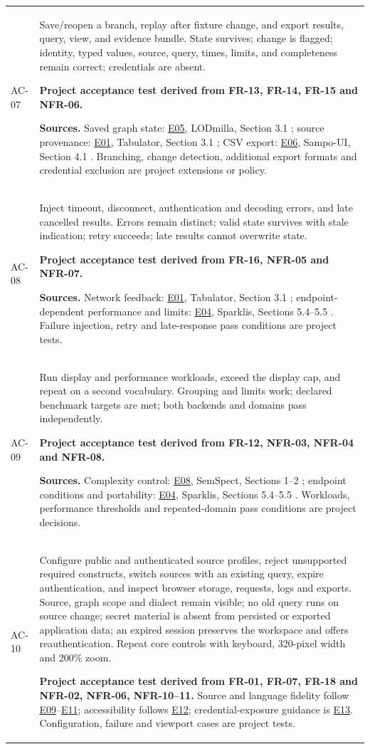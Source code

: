 \documentclass[11pt,a4paper]{article}
\newcommand{\evidence}[1]{\hyperlink{evidence:#1}{#1}}
\begin{document}
{\begin{longtable}{@{}P{1.35cm}P{14.35cm}@{}}
AC-07 & Save/reopen a branch, replay after fixture change, and export results, query, view, and evidence bundle. State survives; change is flagged; identity, typed values, source, query, times, limits, and completeness remain correct; credentials are absent.\par\smallskip \textbf{Project acceptance test derived from FR-13, FR-14, FR-15 and NFR-06.}\par\smallskip \textbf{Sources.} Saved graph state: \evidence{E05}, LODmilla, Section 3.1 \citep{lodmilla}; source provenance: \evidence{E01}, Tabulator, Section 3.1 \citep{tabulator}; CSV export: \evidence{E06}, Sampo-UI, Section 4.1 \citep{sampoui}. Branching, change detection, additional export formats and credential exclusion are project extensions or policy.\\
AC-08 & Inject timeout, disconnect, authentication and decoding errors, and late cancelled results. Errors remain distinct; valid state survives with stale indication; retry succeeds; late results cannot overwrite state.\par\smallskip \textbf{Project acceptance test derived from FR-16, NFR-05 and NFR-07.}\par\smallskip \textbf{Sources.} Network feedback: \evidence{E01}, Tabulator, Section 3.1 \citep{tabulator}; endpoint-dependent performance and limits: \evidence{E04}, Sparklis, Sections 5.4--5.5 \citep{sparklis}. Failure injection, retry and late-response pass conditions are project tests.\\
AC-09 & Run display and performance workloads, exceed the display cap, and repeat on a second vocabulary. Grouping and limits work; declared benchmark targets are met; both backends and domains pass independently.\par\smallskip \textbf{Project acceptance test derived from FR-12, NFR-03, NFR-04 and NFR-08.}\par\smallskip \textbf{Sources.} Complexity control: \evidence{E08}, SemSpect, Sections 1--2 \citep{semspect}; endpoint conditions and portability: \evidence{E04}, Sparklis, Sections 5.4--5.5 \citep{sparklis}. Workloads, performance thresholds and repeated-domain pass conditions are project decisions.\\
AC-10 & Configure public and authenticated source profiles, reject unsupported required constructs, switch sources with an existing query, expire authentication, and inspect browser storage, requests, logs and exports. Source, graph scope and dialect remain visible; no old query runs on source change; secret material is absent from persisted or exported application data; an expired session preserves the workspace and offers reauthentication. Repeat core controls with keyboard, 320-pixel width and 200\% zoom.\par\smallskip \textbf{Project acceptance test derived from FR-01, FR-07, FR-18 and NFR-02, NFR-06, NFR-10--11.} Source and language fidelity follow \evidence{E09}--\evidence{E11}; accessibility follows \evidence{E12}; credential-exposure guidance is \evidence{E13}. Configuration, failure and viewport cases are project tests.\\

\end{longtable}}
\end{document}
